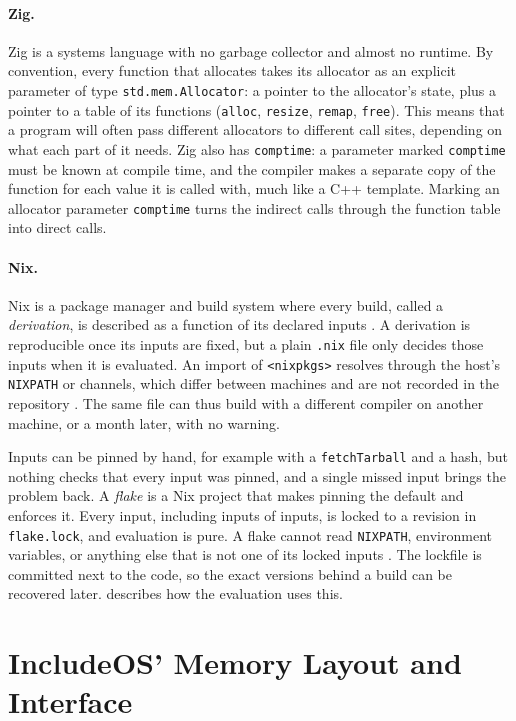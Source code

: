 \documentclass[12pt]{report}
\newcommand{\fullref}[1]{\Cref{#1}}
\renewcommand{\_}{\origunderscore\allowbreak}
\begin{document}
\paragraph{Zig.} Zig is a systems language with no garbage collector and almost no runtime. By convention, every function that allocates takes its allocator as an explicit parameter of type \texttt{std.mem.Allocator}: a pointer to the allocator's state, plus a pointer to a table of its functions (\texttt{alloc}, \texttt{resize}, \texttt{remap}, \texttt{free}). This means that a program will often pass different allocators to different call sites, depending on what each part of it needs. Zig also has \texttt{comptime}: a parameter marked \texttt{comptime} must be known at compile time, and the compiler makes a separate copy of the function for each value it is called with, much like a C++ template. Marking an allocator parameter \texttt{comptime} turns the indirect calls through the function table into direct calls.

\paragraph{Nix.} Nix is a package manager and build system where every build, called a \emph{derivation}, is described as a function of its declared inputs \cite{dolstra2019flakes}. A derivation is reproducible once its inputs are fixed, but a plain \texttt{.nix} file only decides those inputs when it is evaluated. An import of \texttt{<nixpkgs>} resolves through the host's \texttt{NIX\_PATH} or channels, which differ between machines and are not recorded in the repository \cite{dolstra2019flakes}. The same file can thus build with a different compiler on another machine, or a month later, with no warning.

Inputs can be pinned by hand, for example with a \texttt{fetchTarball} and a hash, but nothing checks that every input was pinned, and a single missed input brings the problem back. A \emph{flake} is a Nix project that makes pinning the default and enforces it. Every input, including inputs of inputs, is locked to a revision in \texttt{flake.lock}, and evaluation is pure. A flake cannot read \texttt{NIX\_PATH}, environment variables, or anything else that is not one of its locked inputs \cite{dolstra2019flakes}. The lockfile is committed next to the code, so the exact versions behind a build can be recovered later. \fullref{sec:reproducible-infra} describes how the evaluation uses this.

\section{IncludeOS' Memory Layout and Interface}
\label{sec:includeos-memory-model}
\end{document}
